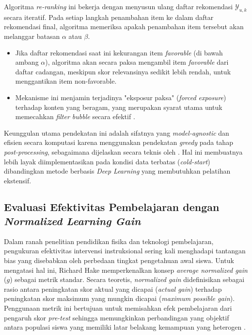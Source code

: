 Algoritma \textit{re-ranking} ini bekerja dengan menyusun ulang daftar
rekomendasi $\mathcal{Y}_{u,k}$ secara iteratif. Pada setiap langkah penambahan
item ke dalam daftar rekomendasi final, algoritma memeriksa apakah penambahan
item tersebut akan melanggar batasan $\alpha$ atau $\beta$.
\begin{itemize}
    \item Jika daftar rekomendasi saat ini kekurangan item \textit{favorable}
    (di bawah ambang $\alpha$), algoritma akan secara paksa mengambil item
    \textit{favorable} dari daftar cadangan, meskipun skor relevansinya sedikit
    lebih rendah, untuk menggantikan item non-favorable.
    \item Mekanisme ini menjamin terjadinya "eksposur paksa" (\textit{forced
    exposure}) terhadap konten yang beragam, yang merupakan syarat utama untuk
    memecahkan \textit{filter bubble} secara efektif \autocite{DeBiasio2023}.
\end{itemize}

Keunggulan utama pendekatan ini adalah sifatnya yang \textit{model-agnostic} dan
efisien secara komputasi karena menggunakan pendekatan \textit{greedy} pada
tahap \textit{post-processing}, sebagaimana dijelaskan secara teknis oleh
\textcite{DeBiasio2023}. Hal ini membuatnya lebih layak diimplementasikan pada
kondisi data terbatas (\textit{cold-start}) dibandingkan metode berbasis
\textit{Deep Learning} yang membutuhkan pelatihan ekstensif.

\subsection{Evaluasi Efektivitas Pembelajaran dengan \textit{Normalized Learning Gain}}

Dalam ranah penelitian pendidikan fisika dan teknologi pembelajaran, pengukuran
efektivitas intervensi instruksional sering kali menghadapi tantangan bias yang
disebabkan oleh perbedaan tingkat pengetahuan awal siswa. Untuk mengatasi hal
ini, Richard Hake memperkenalkan konsep \textit{average normalized gain} ($g$)
sebagai metrik standar. Secara teoretis, \textit{normalized gain} didefinisikan
sebagai rasio antara peningkatan skor aktual yang dicapai (\textit{actual gain})
terhadap peningkatan skor maksimum yang mungkin dicapai (\textit{maximum possible
gain}). Penggunaan metrik ini bertujuan untuk memisahkan efek pembelajaran dari
pengaruh skor \textit{pre-test} sehingga memungkinkan perbandingan yang objektif
antara populasi siswa yang memiliki latar belakang kemampuan yang heterogen
\autocite{Nissen2018}.

